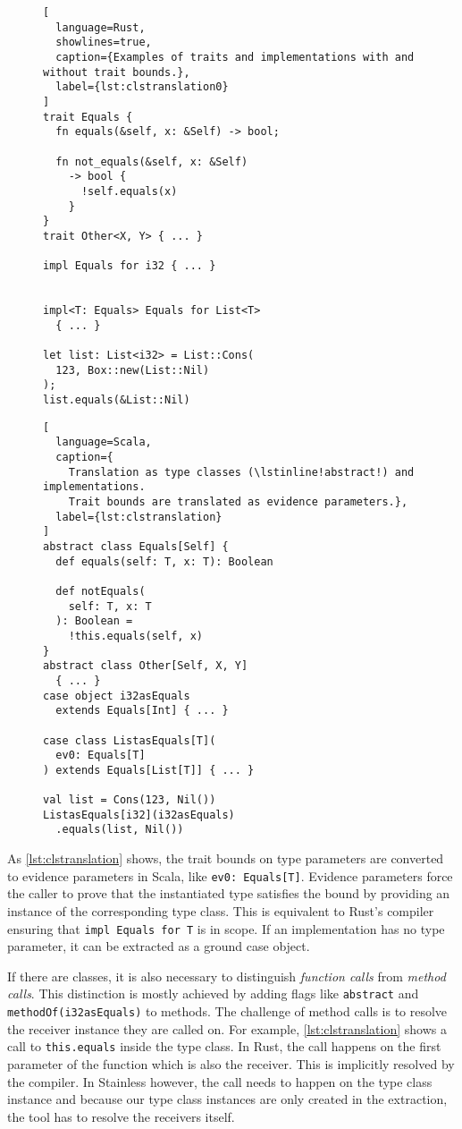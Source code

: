 \begin{figure}
\begin{minipage}[t]{.49\textwidth}
\begin{lstlisting}[
  language=Rust,
  showlines=true,
  caption={Examples of traits and implementations with and without trait bounds.},
  label={lst:clstranslation0}
]
trait Equals {
  fn equals(&self, x: &Self) -> bool;

  fn not_equals(&self, x: &Self)
    -> bool {
      !self.equals(x)
    }
}
trait Other<X, Y> { ... }

impl Equals for i32 { ... }


impl<T: Equals> Equals for List<T>
  { ... }

let list: List<i32> = List::Cons(
  123, Box::new(List::Nil)
);
list.equals(&List::Nil)
\end{lstlisting}
\end{minipage}\hfill
\begin{minipage}[t]{.49\textwidth}
\begin{lstlisting}[
  language=Scala,
  caption={
    Translation as type classes (\lstinline!abstract!) and implementations.
    Trait bounds are translated as evidence parameters.},
  label={lst:clstranslation}
]
abstract class Equals[Self] {
  def equals(self: T, x: T): Boolean

  def notEquals(
    self: T, x: T
  ): Boolean =
    !this.equals(self, x)
}
abstract class Other[Self, X, Y]
  { ... }
case object i32asEquals
  extends Equals[Int] { ... }

case class ListasEquals[T](
  ev0: Equals[T]
) extends Equals[List[T]] { ... }

val list = Cons(123, Nil())
ListasEquals[i32](i32asEquals)
  .equals(list, Nil())
\end{lstlisting}
\end{minipage}
\end{figure}

As \autoref{lst:clstranslation} shows, the trait bounds on type parameters are
converted to evidence parameters in Scala, like \passthrough{\lstinline!ev0:
Equals[T]!}. Evidence parameters force the caller to prove that the instantiated
type satisfies the bound by providing an instance of the corresponding type
class. This is equivalent to Rust's compiler ensuring that
\passthrough{\lstinline!impl Equals for T!} is in scope. If an implementation
has no type parameter, it can be extracted as a ground case object.

If there are classes, it is also necessary to distinguish \emph{function calls}
from \emph{method calls}. This distinction is mostly achieved by adding flags
like \passthrough{\lstinline!abstract!} and
\passthrough{\lstinline!methodOf(i32asEquals)!} to methods. The challenge of
method calls is to resolve the receiver instance they are called on. For
example, \autoref{lst:clstranslation} shows a call to \lstinline!this.equals!
inside the type class. In Rust, the call happens on the first parameter of the
function which is also the receiver. This is implicitly resolved by the
compiler. In Stainless however, the call needs to happen on the type class
instance and because our type class instances are only created in the
extraction, the tool has to resolve the receivers itself.

